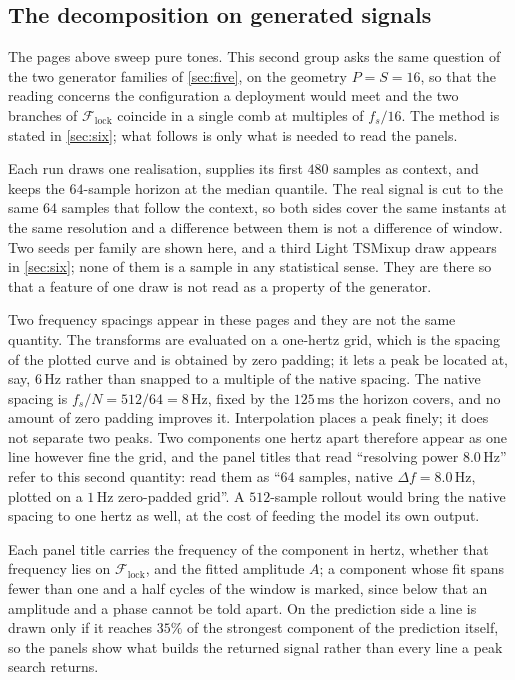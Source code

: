 \subsection{The decomposition on generated signals}

The pages above sweep pure tones. This second group asks the same question of the two generator families of \autoref{sec:five}, on the geometry $P=S=16$, so that the reading concerns the configuration a deployment would meet and the two branches of $\mathcal F_{\mathrm{lock}}$ coincide in a single comb at multiples of $f_s/16$. The method is stated in \autoref{sec:six}; what follows is only what is needed to read the panels.

Each run draws one realisation, supplies its first $480$ samples as context, and keeps the $64$-sample horizon at the median quantile. The real signal is cut to the same $64$ samples that follow the context, so both sides cover the same instants at the same resolution and a difference between them is not a difference of window. Two seeds per family are shown here, and a third Light TSMixup draw appears in \autoref{sec:six}; none of them is a sample in any statistical sense. They are there so that a feature of one draw is not read as a property of the generator.

Two frequency spacings appear in these pages and they are not the same quantity. The transforms are
evaluated on a one-hertz grid, which is the spacing of the plotted curve and is obtained by zero
padding; it lets a peak be located at, say, $6$\,Hz rather than snapped to a multiple of the native
spacing. The native spacing is $f_s/N = 512/64 = 8$\,Hz, fixed by the $125$\,ms the horizon covers,
and no amount of zero padding improves it. Interpolation places a peak finely; it does not separate
two peaks. Two components one hertz apart therefore appear as one line however fine the grid, and
the panel titles that read ``resolving power $8.0$\,Hz'' refer to this second quantity: read them
as ``$64$ samples, native $\Delta f = 8.0$\,Hz, plotted on a $1$\,Hz zero-padded grid''. A
$512$-sample rollout would bring the native spacing to one hertz as well, at the cost of feeding the
model its own output.

Each panel title carries the frequency of the component in hertz, whether that frequency lies on
$\mathcal F_{\mathrm{lock}}$, and the fitted amplitude $A$; a component whose fit spans fewer than
one and a half cycles of the window is marked, since below that an amplitude and a phase cannot be
told apart. On the prediction side a line is drawn only if it reaches $35\%$ of the strongest
component of the prediction itself, so the panels show what builds the returned signal rather than
every line a peak search returns.

